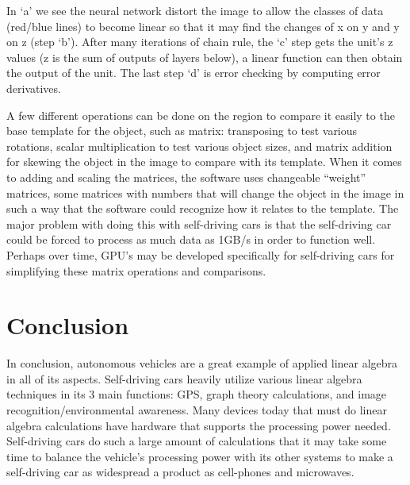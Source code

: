 \documentclass[12pt]{article}
\begin{document}
  In ‘a’ we see the neural network distort the image to allow the classes of data (red/blue lines) to become linear so that it may find the changes of x on y and y on z (step ‘b’). After many iterations of chain rule, the ‘c’ step gets the unit’s z values (z is the sum of outputs of layers below), a linear function can then obtain the output of the unit. The last step ‘d’ is error checking by computing error derivatives.\newline
  
  A few different operations can be done on the region to compare it easily to the base template for the object, such as matrix: transposing to test various rotations, scalar multiplication to test various object sizes, and matrix addition for skewing the object in the image to compare with its template. When it comes to adding and scaling the matrices, the software uses changeable “weight” matrices, some matrices with numbers that will change the object in the image in such a way that the software could recognize how it relates to the template. The major problem with doing this with self-driving cars is that the self-driving car could be forced to process as much data as 1GB/s in order to function well. Perhaps over time, GPU’s may be developed specifically for self-driving cars for simplifying these matrix operations and comparisons.\newline
  

  

















\section{Conclusion}
  In conclusion, autonomous vehicles are a great example of applied linear algebra in all of its aspects. Self-driving cars heavily utilize various linear algebra techniques in its 3 main functions: GPS, graph theory calculations, and image recognition/environmental awareness. Many devices today that must do linear algebra calculations have hardware that supports the processing power needed. Self-driving cars do such a large amount of calculations that it may take some time to balance the vehicle’s processing power with its other systems to make a self-driving car as widespread a product as cell-phones and microwaves.
\end{document}
